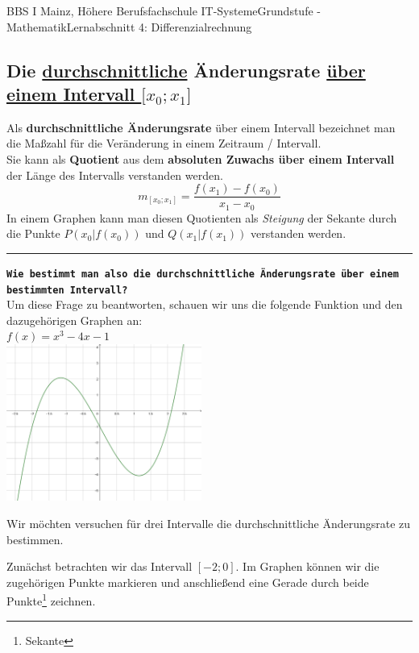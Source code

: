 \documentclass[11pt,twocolumn,oneside,openany,headings=optiontotoc,11pt,numbers=noenddot,final]{article}
\begin{document}
\begin{worksheet}{BBS I Mainz, Höhere Berufsfachschule IT-Systeme}{Grundstufe - Mathematik}{Lernabschnitt 4: Differenzialrechnung}
		\subsection{Die \underline{durchschnittliche} Änderungsrate \underline{über einem Intervall \(\lbrack{}x_0;x_1\rbrack\)}}
		Als \textbf{durchschnittliche Änderungsrate} über einem Intervall bezeichnet man die Maßzahl für die Veränderung in einem Zeitraum / Intervall.\\
		Sie kann als \textbf{Quotient} aus dem \textbf{absoluten Zuwachs über einem Intervall} der Länge des Intervalls verstanden werden.
		\[m_{[x_0;x_1]} = \frac{f(x_1) - f(x_0)}{x_1 - x_0}\]
		In einem Graphen kann man diesen Quotienten als \textit{Steigung} der Sekante durch die Punkte \(P(x_0|f(x_0))\) und \(Q(x_1|f(x_1))\) verstanden werden.\\
		\rule{0.48\textwidth}{0.1pt}
		\texttt{\textbf{Wie bestimmt man also die durchschnittliche Änderungsrate über einem bestimmten Intervall?}}\\
		Um diese Frage zu beantworten, schauen wir uns die folgende Funktion und den dazugehörigen Graphen an:\\
		\(f(x) = x^3 - 4x - 1\)\\
		\includegraphics[width=0.48\textwidth]{../99_Bilder/04_Skr_DQFkt.png}\\
		\par\noindent
		Wir möchten versuchen für drei Intervalle die durchschnittliche Änderungsrate zu bestimmen.\\
		\par\noindent
		Zunächst betrachten wir das Intervall \([-2;0]\). Im Graphen können wir die zugehörigen Punkte markieren und anschließend eine Gerade durch beide Punkte\footnote{Sekante} zeichnen.\\
		\par\noindent
		\begin{minipage}{0.2\textwidth}

\end{minipage}
\end{worksheet}
\end{document}
